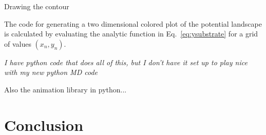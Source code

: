 \documentclass[twocolumn,preprintnumbers,amsmath,amssymb,aps,prx]{revtex4}
\begin{document}
  Drawing the contour 

  The code for generating
  a two dimensional colored plot
  of the potential landscape
  is calculated by evaluating
  the analytic function in Eq.~\ref{eq:ysubstrate}
  for a grid of values $(x_n,y_n)$.

  {\it I have python code that does all of this, but I don't have it
    set up to play nice with my new python MD code}
  
  Also the animation library in python...

\section{Conclusion}
\label{sec:conclusion}	%
\end{document}
